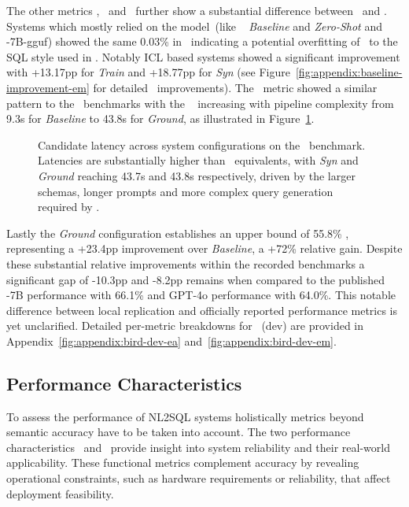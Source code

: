 The other metrics \EM, \ER~and \CL~further show a substantial difference between
\Spider~and \Bird. Systems which mostly relied on the model~(like \Natural~
\textit{Baseline} and \textit{Zero-Shot} and \OmniSQL-7B-gguf) showed the
same 0.03\% in \EM~indicating a potential overfitting of \OmniSQL~to the SQL
style used in \Spider. Notably ICL based systems showed a significant
improvement with +13.17pp for \textit{Train} and +18.77pp for \textit{Syn}
(see Figure~\ref{fig:appendix:baseline-improvement-em} for detailed \EM~improvements).
The \CL~metric showed a similar pattern to the \Spider~benchmarks with the \CL~
increasing with pipeline complexity from 9.3s for \textit{Baseline} to 43.8s
for \textit{Ground}, as illustrated in Figure~\ref{fig:eval:candidate-latency-bird}.

\begin{figure}[htbp]
  \centering
  
  \caption{
    Candidate latency across system configurations on the \Bird~benchmark.
    Latencies are substantially higher than \Spider~equivalents, with
    \textit{Syn} and \textit{Ground} reaching 43.7s and 43.8s respectively,
    driven by the larger schemas, longer prompts and more complex query
    generation required by \Bird.
  }
  \label{fig:eval:candidate-latency-bird}
\end{figure}

Lastly the \textit{Ground} configuration establishes an upper bound of
55.8\% \EA, representing a +23.4pp improvement over \textit{Baseline}, a +72\%
relative gain. Despite these substantial relative improvements within
the recorded benchmarks a significant gap of -10.3pp and -8.2pp remains when
compared to the published \OmniSQL-7B performance with 66.1\% and GPT-4o
performance with 64.0\%. This notable difference between local replication and
officially reported performance metrics is yet unclarified. Detailed per-metric
breakdowns for \Bird~(dev) are provided in
Appendix~\ref{fig:appendix:bird-dev-ea} and~\ref{fig:appendix:bird-dev-em}.

\subsection{Performance Characteristics}

To assess the performance of NL2SQL systems holistically metrics beyond
semantic accuracy have to be taken into account. The two performance
characteristics \ER~and \CL~provide insight into system reliability and their
real-world applicability. These functional metrics complement accuracy by
revealing operational constraints, such as hardware requirements or
reliability, that affect deployment feasibility.

